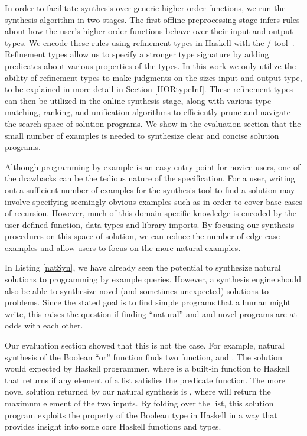In order to facilitate synthesis over generic higher order functions, we run the synthesis algorithm in two stages. 
The first offline preprocessing stage infers rules about how the user's higher order functions behave over their input and output types.
We encode these rules using refinement types in Haskell with the \lhask/ tool~\cite{DBLP:conf/haskell/VazouSJ14}.
Refinement types allow us to specify a stronger type signature by adding predicates about various properties of the types.
In this work we only utilize the ability of refinement types to make judgments on the sizes input and output type, to be explained in more detail in Section \ref{HORtypeInf}.
These refinement types can then be utilized in the online synthesis stage, along with various type matching, ranking, and unification algorithms to efficiently prune and navigate the search space of solution programs.
We show in the evaluation section that the small number of examples is needed to synthesize clear and concise solution programs.

Although programming by example is an easy entry point for novice
users, one of the drawbacks can be the tedious nature of the
specification.  For a user, writing out a sufficient number of
examples for the synthesis tool to find a solution may involve
specifying seemingly obvious examples such as \codeinline{[]->[]} in
order to cover base cases of recursion.  However, much of this domain
specific knowledge is encoded by the user defined function, data types
and library imports.  By focusing our synthesis procedures on this
space of solution, we can reduce the number of edge case examples and
allow users to focus on the more natural examples.


In Listing \ref{natSyn}, we have already seen the potential to synthesize natural solutions to programming by example queries.
However, a synthesis engine should also be able to synthesize novel (and sometimes unexpected) solutions to problems. 
Since the stated goal is to find simple programs that a human might write, this raises the question if finding ``natural'' and and novel programs are at odds with each other.


Our evaluation section showed that this is not the case.
For example, natural synthesis of the Boolean ``or'' function finds two function,  and .
The  solution would expected by Haskell programmer, where  is a built-in function to Haskell that returns  if any element of a list satisfies the predicate function. 
The more novel solution returned by our natural synthesis is , where  will return the maximum element of the two inputs.
By folding over the list, this solution program exploits the  property of the Boolean type in Haskell in a way that provides insight into some core Haskell functions and types.

